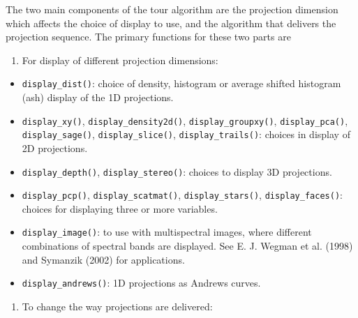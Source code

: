 \documentclass[
  letterpaper,
]{krantz}
\providecommand{\tightlist}{%
  \setlength{\itemsep}{0pt}\setlength{\parskip}{0pt}}\usepackage{longtable,booktabs,array}
\begin{document}
The two main components of the tour algorithm are the projection
dimension which affects the choice of display to use, and the algorithm
that delivers the projection sequence. The primary functions for these
two parts are

\begin{enumerate}
\def\labelenumi{\arabic{enumi}.}
\tightlist
\item
  For display of different projection dimensions:
\end{enumerate}

\begin{itemize}
\tightlist
\item
  \texttt{display\_dist()}: choice of density, histogram or average
  shifted histogram (ash) display of the 1D projections.
\item
  \texttt{display\_xy()}, \texttt{display\_density2d()},
  \texttt{display\_groupxy()}, \texttt{display\_pca()},
  \texttt{display\_sage()}, \texttt{display\_slice()},
  \texttt{display\_trails()}: choices in display of 2D projections.
\item
  \texttt{display\_depth()}, \texttt{display\_stereo()}: choices to
  display 3D projections.
\item
  \texttt{display\_pcp()}, \texttt{display\_scatmat()},
  \texttt{display\_stars()}, \texttt{display\_faces()}: choices for
  displaying three or more variables.
\item
  \texttt{display\_image()}: to use with multispectral images, where
  different combinations of spectral bands are displayed. See E. J.
  Wegman et al. (1998) and Symanzik (2002) for applications.
\item
  \texttt{display\_andrews()}: 1D projections as Andrews curves.
\end{itemize}

\begin{enumerate}
\def\labelenumi{\arabic{enumi}.}
\setcounter{enumi}{1}
\tightlist
\item
  To change the way projections are delivered:
\end{enumerate}
\end{document}
